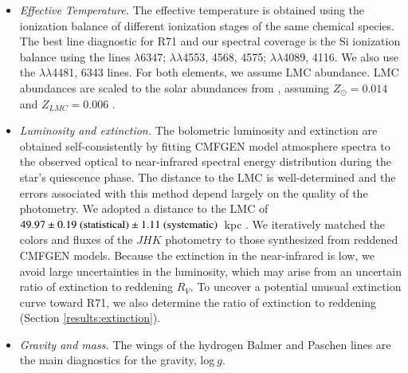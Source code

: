 \documentclass[structabstract]{aa}
\begin{document}
\begin{itemize}

\item {\it Effective Temperature.}
The effective temperature is obtained using the ionization balance of different ionization stages of the same chemical species. The best line diagnostic for R71 and our spectral coverage is the Si ionization balance using the lines  $\lambda$6347;  $\lambda\lambda$4553, 4568, 4575;  $\lambda\lambda$4089, 4116. 
We also use the  $\lambda\lambda$4481, 6343 lines. For both elements, we assume LMC abundance. LMC abundances are scaled to the solar abundances from \citet{2009ARA&A..47..481A}, assuming  $Z_{\odot}=0.014$ and $Z_{LMC}=0.006$ \citep{2013MNRAS.433.1114Y}.  


\item {\it Luminosity and extinction.}
The bolometric luminosity and extinction are obtained self-consistently by fitting CMFGEN model atmosphere spectra to the observed optical to near-infrared spectral energy distribution during the star's quiescence phase. 
The distance to the LMC is well-determined and the errors associated with this method depend largely on the quality of the photometry. We adopted a distance to the LMC of $49.97 \pm 0.19~ \textnormal{(statistical)} \pm 1.11~ \textnormal{(systematic)}$~kpc \citep{2013Natur.495...76P}. We iteratively matched the colors and fluxes of the $JHK$ photometry to those synthesized from reddened CMFGEN models. Because the extinction in the near-infrared is low, we avoid large uncertainties in the luminosity, which may arise from an uncertain ratio of extinction to reddening $R_V$. To uncover a potential unusual extinction curve toward R71, we also determine the ratio of extinction to reddening (Section \ref{results:extinction}). 

\item {\it Gravity and mass.}
The wings of the hydrogen Balmer and Paschen lines are the main diagnostics for the gravity, log$~g$. 



\end{itemize}
\end{document}
